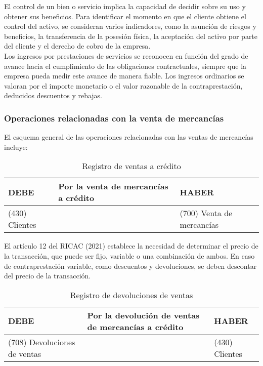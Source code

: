 \documentclass{article}
\begin{document}
El control de un bien o servicio implica la capacidad de decidir sobre su uso y obtener sus beneficios. Para identificar el momento en que el cliente obtiene el control del activo, se consideran varios indicadores, como la asunción de riesgos y beneficios, la transferencia de la posesión física, la aceptación del activo por parte del cliente y el derecho de cobro de la empresa.\\

Los ingresos por prestaciones de servicios se reconocen en función del grado de avance hacia el cumplimiento de las obligaciones contractuales, siempre que la empresa pueda medir este avance de manera fiable. Los ingresos ordinarios se valoran por el importe monetario o el valor razonable de la contraprestación, deducidos descuentos y rebajas.\\

\subsubsection*{Operaciones relacionadas con la venta de mercancías}

El esquema general de las operaciones relacionadas con las ventas de mercancías incluye:

\begin{table}[H]
\centering
\begin{tabular}{|p{4cm}|p{4cm}|p{4cm}|}
\hline
\textbf{DEBE} & \textbf{Por la venta de mercancías a crédito} & \textbf{HABER} \\
\hline
(430) Clientes & & (700) Venta de mercancías \\
\hline
\end{tabular}
\caption{Registro de ventas a crédito}
\end{table}

El artículo 12 del RICAC (2021) establece la necesidad de determinar el precio de la transacción, que puede ser fijo, variable o una combinación de ambos. En caso de contraprestación variable, como descuentos y devoluciones, se deben descontar del precio de la transacción.

\begin{table}[H]
\centering
\begin{tabular}{|p{4cm}|p{4cm}|p{4cm}|}
\hline
\textbf{DEBE} & \textbf{Por la devolución de ventas de mercancías a crédito} & \textbf{HABER} \\
\hline
(708) Devoluciones de ventas & & (430) Clientes \\
\hline
\end{tabular}
\caption{Registro de devoluciones de ventas}
\end{table}
\end{document}
